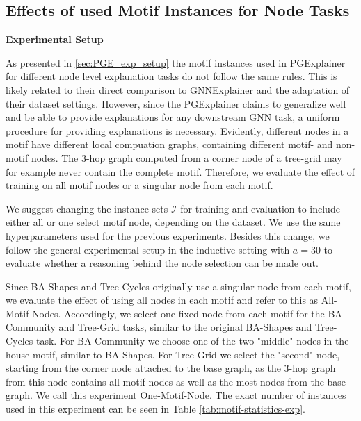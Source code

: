 \subsection{Effects of used Motif Instances for Node Tasks}
\label{sec:motif_set_experiment}

\textbf{Experimental Setup} \par
As presented in \ref{sec:PGE_exp_setup} the motif instances used in PGExplainer \cite{luo2020parameterized} for different node level explanation tasks do not follow the same rules. This is likely related to their direct comparison to GNNExplainer \cite{ying2019gnnexplainer} and the adaptation of their dataset settings. However, since the PGExplainer claims to generalize well and be able to provide explanations for any downstream GNN task, a uniform procedure for providing explanations is necessary. Evidently, different nodes in a motif have different local compuation graphs, containing different motif- and non-motif nodes. The 3-hop graph computed from a corner node of a tree-grid may for example never contain the complete motif. Therefore, we evaluate the effect of training on all motif nodes or a singular node from each motif.

We suggest changing the instance sets $\mathcal{I}$ for training and evaluation to include either all or one select motif node, depending on the dataset. We use the same hyperparameters used for the previous experiments. Besides this change, we follow the general experimental setup in the inductive setting with $a=30$ to evaluate whether a reasoning behind the node selection can be made out. \bigskip

Since BA-Shapes and Tree-Cycles originally use a singular node from each motif, we evaluate the effect of using all nodes in each motif and refer to this as All-Motif-Nodes. Accordingly, we select one fixed node from each motif for the BA-Community and Tree-Grid tasks, similar to the original BA-Shapes and Tree-Cycles task. For BA-Community we choose one of the two "middle" nodes in the house motif, similar to BA-Shapes. For Tree-Grid we select the "second" node, starting from the corner node attached to the base graph, as the 3-hop graph from this node contains all motif nodes as well as the most nodes from the base graph. We call this experiment One-Motif-Node. The exact number of instances used in this experiment can be seen in Table \ref{tab:motif-statistics-exp}.

